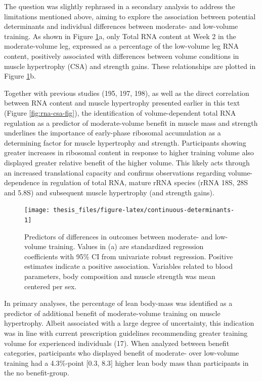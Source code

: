 \documentclass[twoside,10pt]{gihclass} %
\begin{document}
The question was slightly rephrased in a secondary analysis to address the limitations mentioned above, aiming to explore the association between potential determinants and individual differences between moderate- and low-volume training.
As shown in Figure \ref{fig:continuous-determinants}a, only Total RNA content at Week 2 in the moderate-volume leg, expressed as a percentage of the low-volume leg RNA content, positively associated with differences between volume conditions in muscle hypertrophy (CSA) and strength gains. These relationships are plotted in Figure \ref{fig:continuous-determinants}b.

Together with previous studies
(195, 197, 198),
as well as the direct correlation between RNA content and muscle hypertrophy presented earlier in this text
(Figure \ref{fig:rna-csa-fig}),
the identification of volume-dependent total RNA regulation as a predictor of moderate-volume benefit in muscle mass and strength underlines the importance of early-phase ribosomal accumulation as a determining factor for muscle hypertrophy and strength.
Participants showing greater increases in ribosomal content in response to higher training volume also displayed greater relative benefit of the higher volume.
This likely acts through an increased translational capacity and confirms observations regarding volume-dependence in regulation of total RNA, mature rRNA species (rRNA 18S, 28S and 5.8S) and subsequent muscle hypertrophy (and strength gains).
\begin{figure}

{\centering \texttt{[image: thesis\_files/figure-latex/continuous-determinants-1]} 

}

\caption[Determinanats of moderate- over low-volume benefit]{Predictors of differences in outcomes between moderate- and low-volume training. Values in (a) are standardized regression coefficients with 95\% CI from univariate robust regression. Positive estimates indicate a positive association. Variables related to blood parameters, body composition and muscle strength was mean centered per sex.}\label{fig:continuous-determinants}
\end{figure}
In primary analyses, the percentage of lean body-mass was identified as a predictor of additional benefit of moderate-volume training on muscle hypertrophy.
Albeit associated with a large degree of uncertainty, this indication was in line with current prescription guidelines recommending greater training volume for experienced individuals
(17).
When analyzed between benefit categories, participants who displayed benefit of moderate- over low-volume training had a 4.3\%-point {[}0.3, 8.3{]} higher lean body mass than participants in the no benefit-group.
\end{document}
